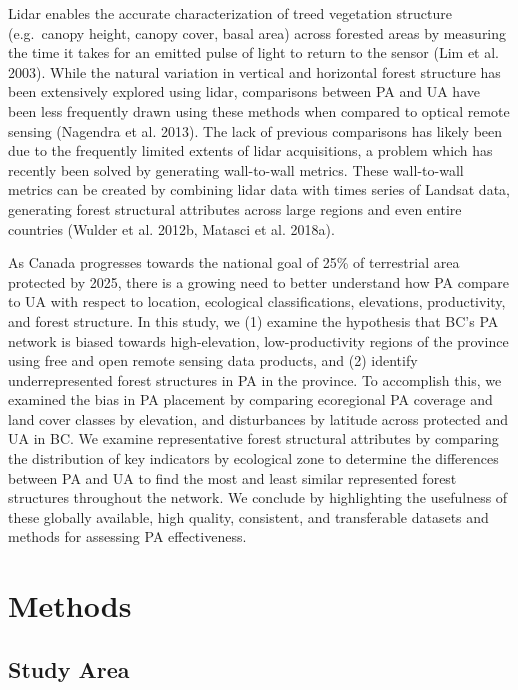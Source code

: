\documentclass[11pt]{article}
\begin{document}
Lidar enables the accurate characterization of treed vegetation
structure (e.g.~canopy height, canopy cover, basal area) across forested
areas by measuring the time it takes for an emitted pulse of light to
return to the sensor (Lim et al. 2003). While the natural variation in
vertical and horizontal forest structure has been extensively explored
using lidar, comparisons between PA and UA have been less frequently
drawn using these methods when compared to optical remote sensing
(Nagendra et al. 2013). The lack of previous comparisons has likely been
due to the frequently limited extents of lidar acquisitions, a problem
which has recently been solved by generating wall-to-wall metrics. These
wall-to-wall metrics can be created by combining lidar data with times
series of Landsat data, generating forest structural attributes across
large regions and even entire countries (Wulder et al. 2012b, Matasci et
al. 2018a).

As Canada progresses towards the national goal of 25\% of terrestrial
area protected by 2025, there is a growing need to better understand how
PA compare to UA with respect to location, ecological classifications,
elevations, productivity, and forest structure. In this study, we (1)
examine the hypothesis that BC's PA network is biased towards
high-elevation, low-productivity regions of the province using free and
open remote sensing data products, and (2) identify underrepresented
forest structures in PA in the province. To accomplish this, we examined
the bias in PA placement by comparing ecoregional PA coverage and land
cover classes by elevation, and disturbances by latitude across
protected and UA in BC. We examine representative forest structural
attributes by comparing the distribution of key indicators by ecological
zone to determine the differences between PA and UA to find the most and
least similar represented forest structures throughout the network. We
conclude by highlighting the usefulness of these globally available,
high quality, consistent, and transferable datasets and methods for
assessing PA effectiveness.

\hypertarget{methods}{%
\section{Methods}\label{methods}}

\hypertarget{study-area}{%
\subsection{Study Area}\label{study-area}}
\end{document}
